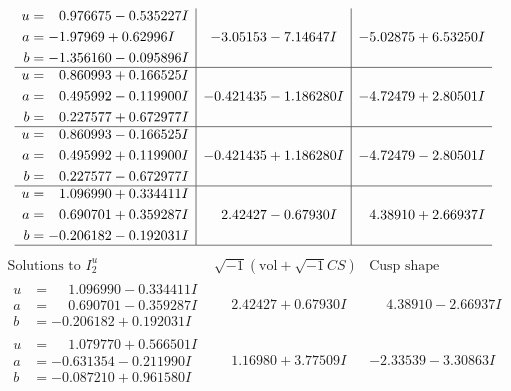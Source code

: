 \documentclass[1p]{elsarticle_modified}
\theoremstyle{definition}
\newcommand{\I}{\sqrt{-1}}
\begin{document}
$$\begin{array}{c|c|c}
\begin{aligned}
u &= \phantom{-}0.976675 - 0.535227 I \\
a &= -1.97969 + 0.62996 I \\
b &= -1.356160 - 0.095896 I\end{aligned}
 & -3.05153 - 7.14647 I & -5.02875 + 6.53250 I \\ \hline\begin{aligned}
u &= \phantom{-}0.860993 + 0.166525 I \\
a &= \phantom{-}0.495992 - 0.119900 I \\
b &= \phantom{-}0.227577 + 0.672977 I\end{aligned}
 & -0.421435 - 1.186280 I & -4.72479 + 2.80501 I \\ \hline\begin{aligned}
u &= \phantom{-}0.860993 - 0.166525 I \\
a &= \phantom{-}0.495992 + 0.119900 I \\
b &= \phantom{-}0.227577 - 0.672977 I\end{aligned}
 & -0.421435 + 1.186280 I & -4.72479 - 2.80501 I \\ \hline\begin{aligned}
u &= \phantom{-}1.096990 + 0.334411 I \\
a &= \phantom{-}0.690701 + 0.359287 I \\
b &= -0.206182 - 0.192031 I\end{aligned}
 & \phantom{-}2.42427 - 0.67930 I & \phantom{-}4.38910 + 2.66937 I\\
 \hline 
 \end{array}$$\newpage$$\begin{array}{c|c|c}  
\text{Solutions to }I^u_{2}& \I (\text{vol} + \sqrt{-1}CS) & \text{Cusp shape}\\
 \hline 
\begin{aligned}
u &= \phantom{-}1.096990 - 0.334411 I \\
a &= \phantom{-}0.690701 - 0.359287 I \\
b &= -0.206182 + 0.192031 I\end{aligned}
 & \phantom{-}2.42427 + 0.67930 I & \phantom{-}4.38910 - 2.66937 I \\ \hline\begin{aligned}
u &= \phantom{-}1.079770 + 0.566501 I \\
a &= -0.631354 - 0.211990 I \\
b &= -0.087210 + 0.961580 I\end{aligned}
 & \phantom{-}1.16980 + 3.77509 I & -2.33539 - 3.30863 I \\ \hline\begin{aligned}

\end{aligned}
\end{array}$$
\end{document}

